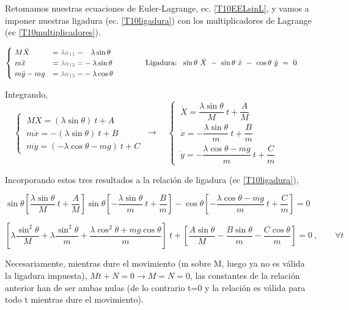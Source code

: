 Retomamos nuestras ecuaciones de Euler-Lagrange, ec. \ref{T10EELsinL}, y vamos a imponer nuestras ligadura (ec. \ref{T10ligadura})  con los multiplicadores de Lagrange (ec \ref{T10multiplicadores}).


\begin{equation}
\label{T10EL}
\begin{cases}
\ M \ddot X &= \textcolor{gris}{\lambda a_{11}=}\ \ \ \lambda \sin \theta \\
\ m \ddot x	&= \textcolor{gris}{\lambda a_{12}=}-\lambda \sin \theta \\
\ m \ddot y - mg &= \textcolor{gris}{\lambda a_{13}=} - \lambda \cos \theta
\end{cases}	\qquad  \qquad 
\text{Ligadura:} \ \ \sin \theta \ \dot X \ - \ \sin \theta \ \dot x \ - \ \cos \theta \ \dot y \ = \ 0 \qquad
\end{equation}

Integrando,
$\quad \begin{cases}
\ M \dot X = (\lambda \sin \theta) \ t	+ A \\
\ m \dot x = -(\lambda \sin \theta) \ t + B \\
\ m \ddot y = (-\lambda \cos \theta - mg)\ t + C
\end{cases}
\ \to \quad
\begin{cases}
\ \dot X = \dfrac{\lambda \sin \theta}{M} \ t + \dfrac AM\\
\ \dot x = -  \dfrac{\lambda \sin \theta}{m} \ t + \dfrac Bm \\
\ \dot y = -  \dfrac{\lambda \cos \theta -mg}{m} \ t +\dfrac Cm
\end{cases}$

Incorporando estos tres resultados a la relación de ligadura (ec \ref{T10ligadura}),

$\sin \theta \left[ \dfrac{\lambda \sin \theta}{M} \ t + \dfrac AM \right] \sin \theta \left[  - 
 \dfrac{\lambda \sin \theta}{m} \ t + \dfrac Bm  \right] -  
 \cos \theta \left[ -  \dfrac{\lambda \cos \theta -mg}{m} \ t +\dfrac Cm \right] = 0$
 
 $\left[ 
\lambda  \dfrac{\sin^2 \theta}{M} + \lambda  \dfrac{\sin^2 \theta}{m} + \dfrac{\lambda \cos^2 \theta + mg \cos \theta}{m}
 \right]\ t +
 \left[
 \dfrac{A \sin \theta}{M} - \dfrac{B \sin \theta}{m} - \dfrac{C \cos \theta}{m} 
 \right]=0 \ , \qquad \forall t$ 

Necesariamente, mientras dure el movimiento (m sobre M, luego ya no es válida la ligadura impuesta), $Mt+N=0 \to M=N=0$, las constantes de la relación anterior han de ser ambas nulas (de lo contrario t=0 y la relación es válida para todo t mientras dure el movimiento).


